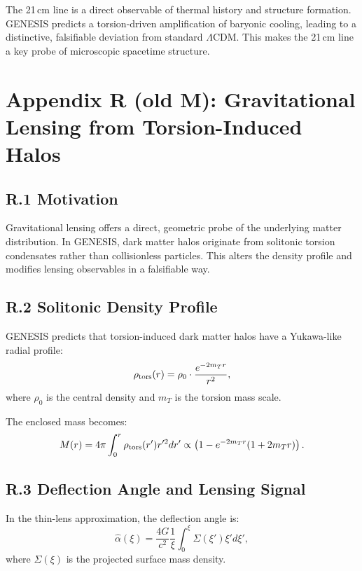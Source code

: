 \documentclass{article}
\begin{document}
\begin{tcolorbox}[colback=gray!5, colframe=black!30, title=Why this matters]
The 21\,cm line is a direct observable of thermal history and structure formation. GENESIS predicts a torsion-driven amplification of baryonic cooling, leading to a distinctive, falsifiable deviation from standard $\Lambda$CDM. This makes the 21\,cm line a key probe of microscopic spacetime structure.
\end{tcolorbox}





\section*{Appendix R (old M): Gravitational Lensing from Torsion-Induced Halos}
\label{app:lensing}

\subsection*{R.1 Motivation}
Gravitational lensing offers a direct, geometric probe of the underlying matter distribution. In GENESIS, dark matter halos originate from solitonic torsion condensates rather than collisionless particles. This alters the density profile and modifies lensing observables in a falsifiable way.

\subsection*{R.2 Solitonic Density Profile}
GENESIS predicts that torsion-induced dark matter halos have a Yukawa-like radial profile:
\begin{equation}
\rho_{\rm tors}(r) = \rho_0 \cdot \frac{e^{-2 m_T r}}{r^2},
\end{equation}
where \( \rho_0 \) is the central density and \( m_T \) is the torsion mass scale.

The enclosed mass becomes:
\begin{equation}
M(r) = 4\pi \int_0^r \rho_{\rm tors}(r') r'^2 dr' \propto \left(1 - e^{-2 m_T r}(1 + 2 m_T r)\right).
\end{equation}

\subsection*{R.3 Deflection Angle and Lensing Signal}
In the thin-lens approximation, the deflection angle is:
\begin{equation}
\hat{\alpha}(\xi) = \frac{4G}{c^2} \frac{1}{\xi} \int_0^\xi \Sigma(\xi') \xi' d\xi',
\end{equation}
where \( \Sigma(\xi) \) is the projected surface mass density.
\end{document}
